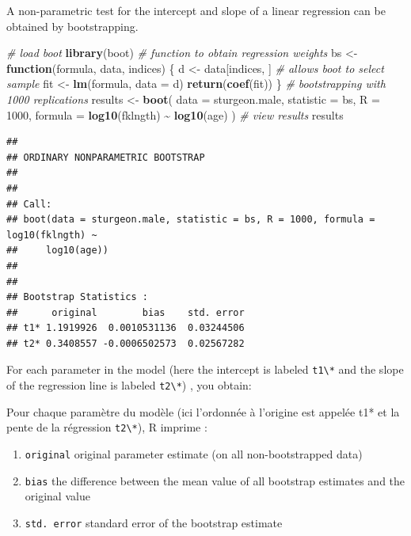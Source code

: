 \documentclass[
  12pt,
]{book}
\newenvironment{Shaded}{\begin{snugshade}}{\end{snugshade}}
\newcommand{\CommentTok}[1]{\textcolor[rgb]{0.56,0.35,0.01}{\textit{#1}}}
\newcommand{\ControlFlowTok}[1]{\textcolor[rgb]{0.13,0.29,0.53}{\textbf{#1}}}
\newcommand{\DataTypeTok}[1]{\textcolor[rgb]{0.13,0.29,0.53}{#1}}
\newcommand{\DecValTok}[1]{\textcolor[rgb]{0.00,0.00,0.81}{#1}}
\newcommand{\KeywordTok}[1]{\textcolor[rgb]{0.13,0.29,0.53}{\textbf{#1}}}
\newcommand{\NormalTok}[1]{#1}
\newcommand{\OperatorTok}[1]{\textcolor[rgb]{0.81,0.36,0.00}{\textbf{#1}}}
\newcommand{\StringTok}[1]{\textcolor[rgb]{0.31,0.60,0.02}{#1}}
\providecommand{\tightlist}{%
  \setlength{\itemsep}{0pt}\setlength{\parskip}{0pt}}
\begin{document}
A non-parametric test for the intercept and slope of a linear regression can be obtained by bootstrapping.

\begin{Shaded}
\begin{Highlighting}[]
\CommentTok{\# load boot}
\KeywordTok{library}\NormalTok{(boot)}
\CommentTok{\# function to obtain regression weights}
\NormalTok{bs \textless{}{-}}\StringTok{ }\ControlFlowTok{function}\NormalTok{(formula, data, indices) \{}
\NormalTok{  d \textless{}{-}}\StringTok{ }\NormalTok{data[indices, ] }\CommentTok{\# allows boot to select sample}
\NormalTok{  fit \textless{}{-}}\StringTok{ }\KeywordTok{lm}\NormalTok{(formula, }\DataTypeTok{data =}\NormalTok{ d)}
  \KeywordTok{return}\NormalTok{(}\KeywordTok{coef}\NormalTok{(fit))}
\NormalTok{\}}
\CommentTok{\# bootstrapping with 1000 replications}
\NormalTok{results \textless{}{-}}\StringTok{ }\KeywordTok{boot}\NormalTok{(}
  \DataTypeTok{data =}\NormalTok{ sturgeon.male,}
  \DataTypeTok{statistic =}\NormalTok{ bs,}
  \DataTypeTok{R =} \DecValTok{1000}\NormalTok{, }\DataTypeTok{formula =} \KeywordTok{log10}\NormalTok{(fklngth) }\OperatorTok{\textasciitilde{}}\StringTok{ }\KeywordTok{log10}\NormalTok{(age)}
\NormalTok{)}
\CommentTok{\# view results}
\NormalTok{results}
\end{Highlighting}
\end{Shaded}

\begin{verbatim}
## 
## ORDINARY NONPARAMETRIC BOOTSTRAP
## 
## 
## Call:
## boot(data = sturgeon.male, statistic = bs, R = 1000, formula = log10(fklngth) ~ 
##     log10(age))
## 
## 
## Bootstrap Statistics :
##      original        bias    std. error
## t1* 1.1919926  0.0010531136  0.03244506
## t2* 0.3408557 -0.0006502573  0.02567282
\end{verbatim}

For each parameter in the model (here the intercept is labeled \texttt{t1\textbackslash{}*} and the slope of the regression line is labeled \texttt{t2\textbackslash{}*}) , you obtain:

Pour chaque paramètre du modèle (ici l'ordonnée à l'origine est
appelée t1* et la pente de la régression \texttt{t2\textbackslash{}*}), R imprime :

\begin{enumerate}
\def\labelenumi{\arabic{enumi}.}
\tightlist
\item
  \texttt{original} original parameter estimate (on all non-bootstrapped data)
\item
  \texttt{bias} the difference between the mean value of all bootstrap estimates and the original value
\item
  \texttt{std.\ error} standard error of the bootstrap estimate
\end{enumerate}
\end{document}
